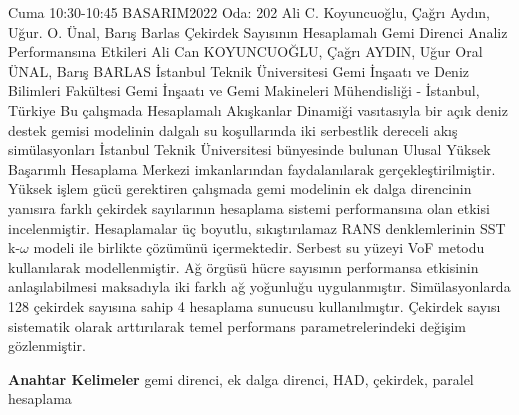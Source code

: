 
    \begin{abstract_basarim}
    {Cuma 10:30-10:45}
    {BASARIM2022}
    {Oda: 202}
    {Ali C. Koyuncuoğlu, Çağrı Aydın, Uğur. O. Ünal, Barış Barlas}
    {Çekirdek Sayısının Hesaplamalı Gemi Direnci Analiz Performansına Etkileri}
    {%
    Ali Can KOYUNCUOĞLU, Çağrı AYDIN, Uğur Oral ÜNAL, Barış BARLAS}
    {%
    }
    {%
    İstanbul Teknik Üniversitesi Gemi İnşaatı ve Deniz Bilimleri Fakültesi Gemi İnşaatı ve Gemi Makineleri Mühendisliği - İstanbul, Türkiye}
    Bu çalışmada Hesaplamalı Akışkanlar Dinamiği vasıtasıyla bir açık deniz destek gemisi modelinin dalgalı su koşullarında iki serbestlik dereceli akış simülasyonları İstanbul Teknik Üniversitesi bünyesinde bulunan Ulusal Yüksek Başarımlı Hesaplama Merkezi imkanlarından faydalanılarak gerçekleştirilmiştir. Yüksek işlem gücü gerektiren çalışmada gemi modelinin ek dalga direncinin yanısıra farklı çekirdek sayılarının hesaplama sistemi performansına olan etkisi incelenmiştir. Hesaplamalar üç boyutlu, sıkıştırılamaz RANS denklemlerinin SST k-$\omega$ modeli ile birlikte çözümünü içermektedir. Serbest su yüzeyi VoF metodu kullanılarak modellenmiştir. Ağ örgüsü hücre sayısının performansa etkisinin anlaşılabilmesi maksadıyla iki farklı ağ yoğunluğu uygulanmıştır. Simülasyonlarda 128 çekirdek sayısına sahip 4 hesaplama sunucusu kullanılmıştır. Çekirdek sayısı sistematik olarak arttırılarak temel performans parametrelerindeki değişim gözlenmiştir. 
    
            \textbf{Anahtar Kelimeler} \newline{}gemi direnci, ek dalga direnci, HAD, çekirdek, paralel hesaplama
    \end{abstract_basarim}
    